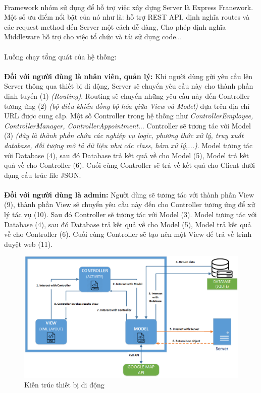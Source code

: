 \documentclass[a4paper]{article}
\begin{document}
\\
Framework nhóm sử dụng để hỗ trợ việc xây dựng Server là Express Franework. Một số ưu điểm nổi bật của nó như là: hỗ trợ REST API, định nghĩa routes và các request method đến Server một cách dễ dàng, Cho phép định nghĩa Middleware hỗ trợ cho việc tổ chức và tái sử dụng code...\\
\\
Luồng chạy tổng quát của hệ thống:\\
\\
\textbf{Đối với người dùng là nhân viên, quản lý:} Khi người dùng gửi yêu cầu lên Server thông qua thiết bị di động, Server sẽ chuyển yêu cầu này cho thành phần định tuyến (1) \textit{(Routing)}. Routing sẽ chuyển những yêu cầu này đến Controller tương ứng (2) \textit{(bộ điều khiển đồng bộ hóa giữa View và Model)} dựa trên địa chỉ URL được cung cấp. Một số Controller trong hệ thống như \textit{ControllerEmployee, ControllerManager, ControllerAppointment}... Controller sẽ tương tác với Model (3) \textit{(đây là thành phần chứa các nghiệp vụ logic, phương thức xử lý, truy xuất database, đối tượng mô tả dữ liệu như các class, hàm xử lý,...)}. Model tương tác với Database (4), sau đó Database trả kết quả về cho Model (5), Model trả kết quả về cho Controller (6). Cuối cùng Controller sẽ trả về kết quả cho Client dưới dạng cấu trúc file JSON.\\
\\
\textbf{Đối với người dùng là admin:} Người dùng sẽ tương tác với thành phần View (9), thành phần View sẽ chuyển yêu cầu này đến cho Controller tương ứng để xử lý tác vụ (10). Sau đó Controller sẽ tương tác với Model (3). Model tương tác với Database (4), sau đó Database trả kết quả về cho Model (5), Model trả kết quả về cho Controller (6). Cuối cùng Controller sẽ tạo nên một View để trả về trình duyệt web (11).\\
\begin{figure}[!h]
    \includegraphics[scale=0.53]{mobile_architecture}
    \centering
    \caption{Kiến trúc thiết bị di động}
    \label{fig:mobile_architecture}
\end{figure}
\end{document}

